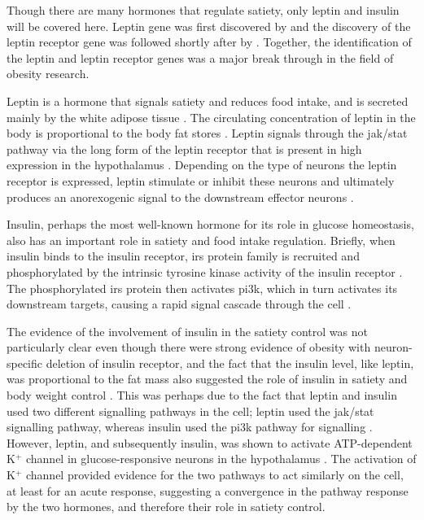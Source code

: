 Though there are many hormones that regulate satiety, only leptin and insulin will be covered here.
Leptin gene was first discovered by \citet{Zhang1994} and the discovery of the leptin receptor gene was followed shortly after by \citet{Tartaglia1995}.
Together, the identification of the leptin and leptin receptor genes was a major break through in the field of obesity research.

Leptin is a hormone that signals satiety and reduces food intake, and is secreted mainly by the white adipose tissue \citep{Moustafa2013,Zhang1994}.
The circulating concentration of leptin in the body is proportional to the body fat stores \citep{Barsh2002, Moustafa2013}.
Leptin signals through the \gls{jak}/\gls{stat} pathway via the long form of the leptin receptor that is present in high expression in the hypothalamus \citep{Ghilardi1996,Lee1996}.
Depending on the type of neurons the leptin receptor is expressed, leptin stimulate or inhibit these neurons and ultimately produces an anorexogenic signal to the downstream effector neurons \citep{Bell2005}.

Insulin, perhaps the most well-known hormone for its role in glucose homeostasis, also has an important role in satiety and food intake regulation.
Briefly, when insulin binds to the insulin receptor, \gls{irs} protein family is recruited and phosphorylated by the  intrinsic tyrosine kinase activity of the insulin receptor \citep{Saltiel2002}.
The phosphorylated \gls{irs} protein then activates \gls{pi3k}, which in turn activates its downstream targets, causing a rapid signal cascade through the cell \citep{Saltiel2002}.

The evidence of the involvement of insulin in the satiety control was not particularly clear even though there were strong evidence of obesity with neuron-specific deletion of insulin receptor, and the fact that the insulin level, like leptin, was proportional to the fat mass also suggested the role of insulin in satiety and body weight control \citep{Barsh2002, Bruning2000, Woods1979}.
This was perhaps due to the fact that leptin and insulin used two different signalling pathways in the cell; leptin used the \gls{jak}/\gls{stat} signalling pathway, whereas insulin used the \gls{pi3k} pathway for signalling \citep{Ghilardi1996}.
However, leptin, and subsequently insulin, was shown to activate ATP-dep\-endent K$^+$ channel in glucose-responsive neurons in the hypothalamus \citep{Spanswick1997, Spanswick2000}.
The activation of K$^+$ channel provided evidence for the two pathways to act similarly on the cell, at least for an acute response, suggesting a convergence in the pathway response by the two hormones, and therefore their role in satiety control.

